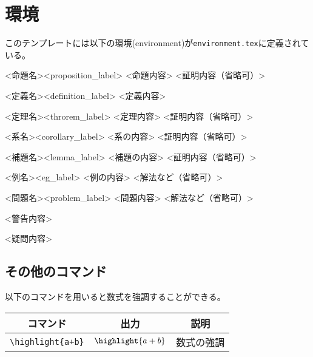 \chapter{環境}

このテンプレートには以下の環境(environment)が\verb|environment.tex|に定義されている。

\begin{proposition}{<命題名>}{<proposition_label>}
    <命題内容>
    \tcblower
    <証明内容（省略可）>
\end{proposition}

\begin{definition}{<定義名>}{<definition_label>}
    <定義内容>
\end{definition}

\begin{theorem}{<定理名>}{<throrem_label>}
    <定理内容>
    \tcblower
    <証明内容（省略可）>
\end{theorem}

\begin{corollary}{<系名>}{<corollary_label>}
    <系の内容>
    \tcblower
    <証明内容（省略可）>
\end{corollary}

\begin{lemma}{<補題名>}{<lemma_label>}
    <補題の内容>
    \tcblower
    <証明内容（省略可）>
\end{lemma}

\begin{eg}{<例名>}{<eg_label>}
    <例の内容>
    \tcblower
    <解法など（省略可）>
\end{eg}

\begin{problem}{<問題名>}{<problem_label>}
<問題内容>
\tcblower
<解法など（省略可）>
\end{problem}

\begin{warning}
    <警告内容>
\end{warning}

\begin{question}
    <疑問内容>
\end{question}

\section{その他のコマンド}

以下のコマンドを用いると数式を強調することができる。

\begin{longtable}{ccc}
    \toprule
    コマンド               & 出力                              & 説明       \\
    \midrule
    \verb|\highlight{a+b}| & \(\displaystyle \highlight{a+b}\) & 数式の強調 \\
    \bottomrule
\end{longtable}